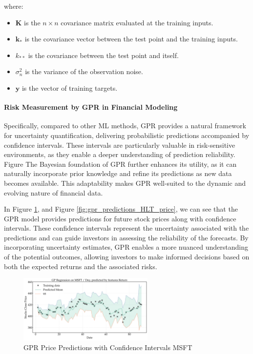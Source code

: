 where:

\begin{itemize}
    \item $\mathbf{K}$ is the $n \times n$ covariance matrix evaluated at the training inputs.
    \item $\mathbf{k}_*$ is the covariance vector between the test point and the training inputs.
    \item $k_{**}$ is the covariance between the test point and itself.
    \item $\sigma_n^2$ is the variance of the observation noise.
    \item $\mathbf{y}$ is the vector of training targets.
\end{itemize}

\paragraph{Risk Measurement by GPR in Financial Modeling}

Specifically, compared to other \ac{ML} methods, \ac{GPR} provides a natural framework for uncertainty quantification, delivering probabilistic predictions accompanied by confidence intervals. 
These intervals are particularly valuable in risk-sensitive environments, as they enable a deeper understanding of prediction reliability. Figure
The Bayesian foundation of GPR further enhances its utility, as it can naturally incorporate prior knowledge and refine its predictions as new data becomes available. This adaptability makes GPR well-suited to the dynamic and evolving nature of financial data.

In Figure \ref{fig:gpr_predictions_MSFT_price}, and Figure \ref{fig:gpr_predictions_HLT_price}, we can see that the GPR model provides predictions for future stock prices along with confidence intervals. 
These confidence intervals represent the uncertainty associated with the predictions and can guide investors in assessing the reliability of the forecasts. By incorporating uncertainty estimates, GPR enables a more nuanced understanding of the potential outcomes, allowing investors to make informed decisions based on both the expected returns and the associated risks.

\begin{figure}[h]
    \centering
    \includegraphics[width=0.6\textwidth]{figures/future_predictions_MSFT.png}
    \caption{GPR Price Predictions with Confidence Intervals MSFT}
    \label{fig:gpr_predictions_MSFT_price}
\end{figure}

